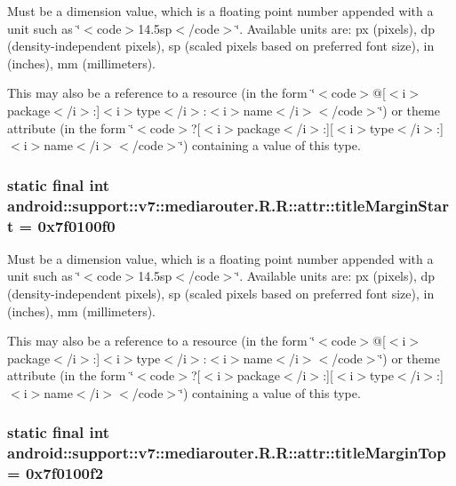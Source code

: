 Must be a dimension value, which is a floating point number appended with a unit such as \char`\"{}$<$code$>$14.5sp$<$/code$>$\char`\"{}. Available units are: px (pixels), dp (density-independent pixels), sp (scaled pixels based on preferred font size), in (inches), mm (millimeters). 

This may also be a reference to a resource (in the form \char`\"{}$<$code$>$@\mbox{[}$<$i$>$package$<$/i$>$:\mbox{]}$<$i$>$type$<$/i$>$:$<$i$>$name$<$/i$>$$<$/code$>$\char`\"{}) or theme attribute (in the form \char`\"{}$<$code$>$?\mbox{[}$<$i$>$package$<$/i$>$:\mbox{]}\mbox{[}$<$i$>$type$<$/i$>$:\mbox{]}$<$i$>$name$<$/i$>$$<$/code$>$\char`\"{}) containing a value of this type. \hypertarget{classandroid_1_1support_1_1v7_1_1mediarouter_1_1_r_1_1attr_f10d68ba978bb1d9b9c021cb59b4cc57}{
\subsubsection[{titleMarginStart}]{\setlength{\rightskip}{0pt plus 5cm}static final int android::support::v7::mediarouter.R.R::attr::titleMarginStart = 0x7f0100f0}}
\label{classandroid_1_1support_1_1v7_1_1mediarouter_1_1_r_1_1attr_f10d68ba978bb1d9b9c021cb59b4cc57}


Must be a dimension value, which is a floating point number appended with a unit such as \char`\"{}$<$code$>$14.5sp$<$/code$>$\char`\"{}. Available units are: px (pixels), dp (density-independent pixels), sp (scaled pixels based on preferred font size), in (inches), mm (millimeters). 

This may also be a reference to a resource (in the form \char`\"{}$<$code$>$@\mbox{[}$<$i$>$package$<$/i$>$:\mbox{]}$<$i$>$type$<$/i$>$:$<$i$>$name$<$/i$>$$<$/code$>$\char`\"{}) or theme attribute (in the form \char`\"{}$<$code$>$?\mbox{[}$<$i$>$package$<$/i$>$:\mbox{]}\mbox{[}$<$i$>$type$<$/i$>$:\mbox{]}$<$i$>$name$<$/i$>$$<$/code$>$\char`\"{}) containing a value of this type. \hypertarget{classandroid_1_1support_1_1v7_1_1mediarouter_1_1_r_1_1attr_9ab52bdfb9235e372ad45e9d88aa2d93}{
\subsubsection[{titleMarginTop}]{\setlength{\rightskip}{0pt plus 5cm}static final int android::support::v7::mediarouter.R.R::attr::titleMarginTop = 0x7f0100f2}}
\label{classandroid_1_1support_1_1v7_1_1mediarouter_1_1_r_1_1attr_9ab52bdfb9235e372ad45e9d88aa2d93}


